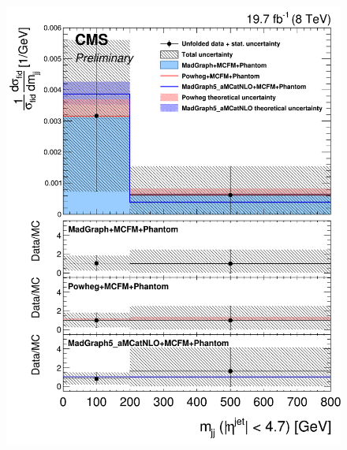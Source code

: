 \begin{figure}[hbtp]
\begin{center}
    \includegraphics[width=\cmsFigWidth]{Figures/DiffCrossSecZZTo4eMjj_Unfolded_fr_MadGraph_norm.png}     

\end{center}
\end{figure}
